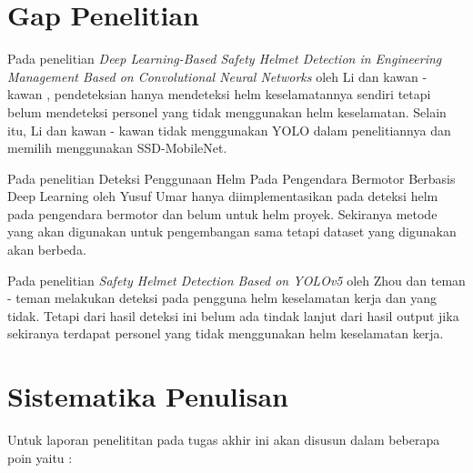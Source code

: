 \section{Gap Penelitian}
Pada penelitian \emph{Deep Learning-Based Safety Helmet Detection in Engineering Management Based on Convolutional Neural Networks} oleh Li dan kawan - kawan , pendeteksian hanya mendeteksi helm keselamatannya sendiri tetapi belum mendeteksi personel yang tidak menggunakan helm keselamatan. Selain itu, Li dan kawan - kawan tidak menggunakan YOLO dalam penelitiannya dan memilih menggunakan SSD-MobileNet.
\par Pada penelitian Deteksi Penggunaan Helm Pada Pengendara Bermotor Berbasis Deep Learning oleh Yusuf Umar hanya diimplementasikan pada deteksi helm pada pengendara bermotor dan belum untuk helm proyek. Sekiranya metode yang akan digunakan untuk pengembangan sama tetapi dataset yang digunakan akan berbeda.
\par Pada penelitian \emph{Safety Helmet Detection Based on YOLOv5} oleh Zhou dan teman - teman melakukan deteksi pada pengguna helm keselamatan kerja dan yang tidak. Tetapi dari hasil deteksi ini belum ada tindak lanjut dari hasil output jika
sekiranya terdapat personel yang tidak menggunakan helm keselamatan kerja. 

\section{Sistematika Penulisan}
\label{sec:sistematikapenulisan}

Untuk laporan penelititan pada tugas akhir ini akan disusun dalam beberapa poin yaitu :

